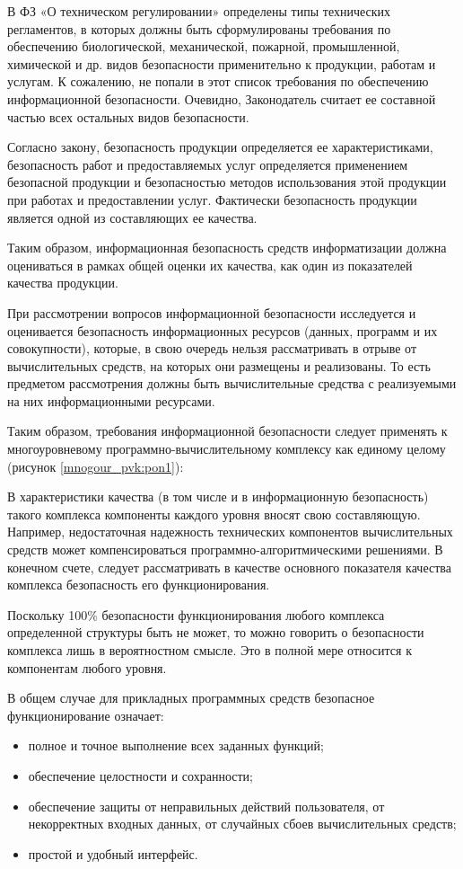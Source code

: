 В ФЗ «О техническом регулировании» определены типы технических регламентов, в которых должны быть сформулированы требования по обеспечению биологической, механической, пожарной, промышленной, химической и др. видов безопасности применительно к продукции, работам и услугам. К сожалению, не попали в этот список требования по обеспечению информационной безопасности. Очевидно, Законодатель считает ее составной частью всех остальных видов безопасности.

Согласно закону, безопасность продукции определяется ее характеристиками, безопасность работ и предоставляемых услуг определяется применением безопасной продукции и безопасностью методов использования этой продукции при работах и предоставлении услуг. Фактически безопасность продукции является одной из составляющих ее качества.

Таким образом, информационная безопасность средств информатизации должна оцениваться в рамках общей оценки их качества, как один из показателей качества продукции.

При рассмотрении вопросов информационной безопасности исследуется и оценивается безопасность информационных ресурсов (данных, программ и их совокупности), которые, в свою очередь нельзя рассматривать в отрыве от вычислительных средств, на которых они размещены и реализованы. То есть предметом рассмотрения должны быть вычислительные средства с реализуемыми на них информационными ресурсами.

Таким образом, требования информационной безопасности следует применять к многоуровневому программно-вычислительному комплексу как единому целому (рисунок \ref{mnogour_pvk:pon1}):

В характеристики качества (в том числе и в информационную безопасность) такого комплекса компоненты каждого уровня вносят свою составляющую. Например, недостаточная надежность технических компонентов вычислительных средств может компенсироваться программно-алгоритмическими решениями. В конечном счете, следует рассматривать в качестве основного показателя качества комплекса безопасность его функционирования.

Поскольку 100\% безопасности функционирования любого комплекса определенной структуры быть не может, то можно говорить о безопасности комплекса лишь в вероятностном смысле. Это в полной мере относится к компонентам любого уровня.

В общем случае для прикладных программных средств безопасное функционирование означает:

\begin{itemize}
\item полное и точное выполнение всех заданных функций;
\item обеспечение целостности и сохранности;
\item обеспечение защиты от неправильных действий пользователя, от некорректных входных данных, от случайных сбоев вычислительных средств;
\item простой и удобный интерфейс.
\end{itemize}

